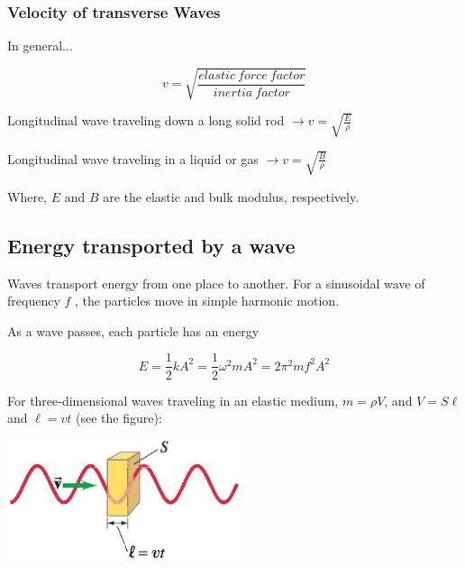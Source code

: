 \documentclass[]{beamer}
\begin{document}
\begin{frame}
\frametitle{Velocity of transverse Waves}

In general...

\pause
\begin{equation*}
 v=\sqrt{\frac{elastic~force~factor}{inertia~factor}}
\end{equation*}
\pause
\vspace{2mm}

Longitudinal wave traveling down a long solid rod $ \rightarrow v=\sqrt{\frac{E}{\rho}}$

\pause
\vspace{2mm}
Longitudinal wave traveling in a liquid or gas $ \rightarrow v=\sqrt{\frac{B}{\rho}}$

\pause
\vspace{4mm}
Where, $E$ and $B$ are the elastic and bulk modulus, respectively.

  \end{frame}


\subsection{Energy transported by a wave}
\begin{frame}

Waves transport energy from one place to another. For a sinusoidal wave of frequency $f$ , the particles move in
simple harmonic motion.
\pause
\vspace{2mm}

As a wave passes, each particle has an energy
\pause

\begin{equation}
 E=\frac{1}{2} k A^2=\frac{1}{2} \omega^2 mA^2= 2\pi^2 mf^2A^2
\end{equation}

\pause
For three-dimensional waves traveling in an elastic medium, $m=\rho V$, and $V=S\ell$ and $\ell=vt$ (see the figure):

\pause
  \begin{center}
  \includegraphics[height=1.4in]{images4/7.jpg}
\end{center}


  \end{frame}
\end{document}
